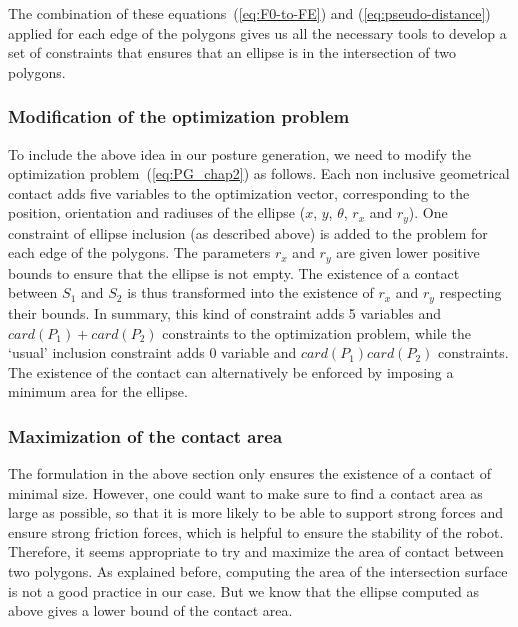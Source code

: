 The combination of these equations~(\ref{eq:F0-to-FE}) and (\ref{eq:pseudo-distance}) applied for each edge of the polygons gives us all the necessary tools to develop a set of constraints that ensures that an ellipse is in the intersection of two polygons.


\subsubsection{Modification of the optimization problem}
To include the above idea in our posture generation, we need to modify the optimization problem~(\ref{eq:PG_chap2}) as follows.
Each non inclusive geometrical contact adds five variables to the optimization vector, corresponding to the position, orientation and radiuses of the ellipse ($x$, $y$, $\theta$, $r_x$ and $r_y$).
One constraint of ellipse inclusion (as described above) is added to the problem for each edge of the polygons.
The parameters $r_x$ and $r_y$ are given lower positive bounds to ensure that the ellipse is not empty.
The existence of a contact between $S_1$ and $S_2$ is thus transformed into the existence of $r_x$ and $r_y$ respecting their bounds.
In summary, this kind of constraint adds 5 variables and $card(P_1)+card(P_2)$ constraints to the optimization problem, while the `usual' inclusion constraint adds 0 variable and $card(P_1)card(P_2)$ constraints.
The existence of the contact can alternatively be enforced by imposing a minimum area for the ellipse.

\subsubsection{Maximization of the contact area}
\label{subsubsec:optim-ellipse-area}

The formulation in the above section only ensures the existence of a contact of minimal size.
However, one could want to make sure to find a contact area as large as possible, so that it is more likely to be able to support strong forces and ensure strong friction forces, which is helpful to ensure the stability of the robot.
Therefore, it seems appropriate to try and maximize the area of contact between two polygons.
As explained before, computing the area of the intersection surface is not a good practice in our case.
But we know that the ellipse computed as above gives a lower bound of the contact area.

